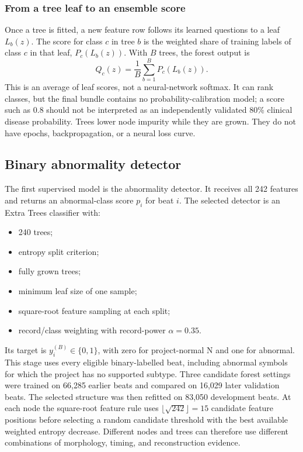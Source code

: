 \subsubsection{From a tree leaf to an ensemble score}

Once a tree is fitted, a new feature row follows its learned questions to a
leaf $L_b(z)$. The score for class $c$ in tree $b$ is the weighted share of
training labels of class $c$ in that leaf,
$P_c(L_b(z))$. With $B$ trees, the forest output is
\begin{equation}
 Q_c(z)=\frac{1}{B}\sum_{b=1}^{B}P_c(L_b(z)).
 \label{eq:method-forest-score}
\end{equation}
This is an average of leaf scores, not a neural-network softmax. It can rank
classes, but the final bundle contains no probability-calibration model; a
score such as 0.8 should not be interpreted as an independently validated
80\% clinical disease probability. Trees lower node impurity while they are
grown. They do not have epochs, backpropagation, or a neural loss curve.

\subsection{Binary abnormality detector}

The first supervised model is the abnormality detector. It receives all 242
features and returns an abnormal-class score $p_i$ for beat $i$. The
selected detector is an Extra Trees classifier with:
\begin{itemize}
\item 240 trees;
\item entropy split criterion;
\item fully grown trees;
\item minimum leaf size of one sample;
\item square-root feature sampling at each split;
\item record/class weighting with record-power $\alpha=0.35$.
\end{itemize}
Its target is $y_i^{(B)}\in\{0,1\}$, with zero for project-normal N and one
for abnormal. This stage uses every eligible binary-labelled beat, including
abnormal symbols for which the project has no supported subtype. Three
candidate forest settings were trained on 66,285 earlier beats and compared
on 16,029 later validation beats. The selected structure was then refitted
on 83,050 development beats. At each node the square-root feature rule
uses $\lfloor\sqrt{242}\rfloor=15$ candidate feature positions
before selecting a random candidate threshold with the best available
weighted entropy decrease. Different nodes and trees can therefore use
different combinations of morphology, timing, and reconstruction evidence.

